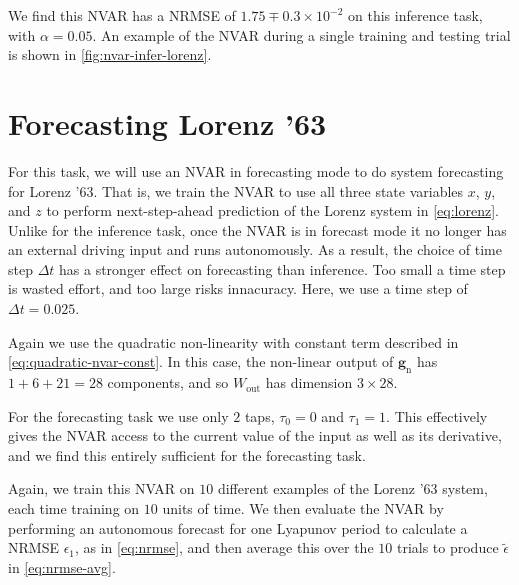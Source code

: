 We find this NVAR has a NRMSE of $1.75\mp0.3\times10^{-2}$ on this
inference task, with $\alpha = 0.05$. An example of the NVAR during a
single training and testing trial is shown in
\cref{fig:nvar-infer-lorenz}.

\section{Forecasting Lorenz '63}

For this task, we will use an NVAR in forecasting mode to do system
forecasting for Lorenz '63. That is, we train the NVAR to use all
three state variables $x$, $y$, and $z$ to perform next-step-ahead
prediction of the Lorenz system in \cref{eq:lorenz}. Unlike for the inference task, once
the NVAR is in forecast mode it no longer has an external driving
input and runs autonomously. As a result, the choice of time step
$\Delta t$ has a stronger effect on forecasting than inference. Too
small a time step is wasted effort, and too large risks
innacuracy. Here, we use a time step of $\Delta t = 0.025$.

Again we use the quadratic non-linearity with constant term described
in \cref{eq:quadratic-nvar-const}. In this case, the non-linear output
of $\bm{g}_\text{n}$ has $1 + 6 + 21 = 28$ components, and so $W_\text{out}$ has
dimension $3 \times 28$.

For the forecasting task we use only $2$ taps, $\tau_0 = 0$ and
$\tau_1 = 1$. This effectively gives the NVAR access to the current
value of the input as well as its derivative, and we find this
entirely sufficient for the forecasting task.

Again, we train this NVAR on $10$ different examples of the Lorenz '63
system, each time training on $10$ units of time. We then evaluate the
NVAR by performing an autonomous forecast for one Lyapunov period to
calculate a NRMSE $\epsilon_1$, as in \cref{eq:nrmse}, and then
average this over the $10$ trials to produce $\tilde{\epsilon}$ in
\cref{eq:nrmse-avg}.

